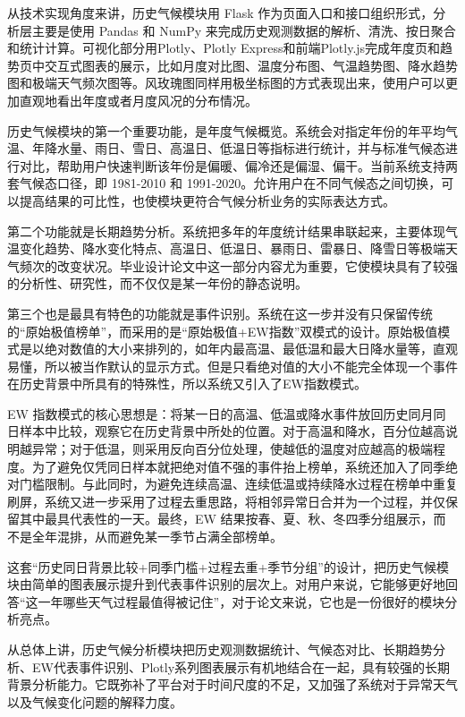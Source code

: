 从技术实现角度来讲，历史气候模块用 Flask 作为页面入口和接口组织形式，分析层主要是使用 Pandas 和 NumPy 来完成历史观测数据的解析、清洗、按日聚合和统计计算。可视化部分用Plotly、Plotly Express和前端Plotly.js完成年度页和趋势页中交互式图表的展示，比如月度对比图、温度分布图、气温趋势图、降水趋势图和极端天气频次图等。风玫瑰图同样用极坐标图的方式表现出来，使用户可以更加直观地看出年度或者月度风况的分布情况。

历史气候模块的第一个重要功能，是年度气候概览。系统会对指定年份的年平均气温、年降水量、雨日、雪日、高温日、低温日等指标进行统计，并与标准气候态进行对比，帮助用户快速判断该年份是偏暖、偏冷还是偏湿、偏干。当前系统支持两套气候态口径，即 1981-2010 和 1991-2020。允许用户在不同气候态之间切换，可以提高结果的可比性，也使模块更符合气候分析业务的实际表达方式。

第二个功能就是长期趋势分析。系统把多年的年度统计结果串联起来，主要体现气温变化趋势、降水变化特点、高温日、低温日、暴雨日、雷暴日、降雪日等极端天气频次的改变状况。毕业设计论文中这一部分内容尤为重要，它使模块具有了较强的分析性、研究性，而不仅仅是某一年份的静态说明。

第三个也是最具有特色的功能就是事件识别。系统在这一步并没有只保留传统的“原始极值榜单”，而采用的是“原始极值+EW指数”双模式的设计。原始极值模式是以绝对数值的大小来排列的，如年内最高温、最低温和最大日降水量等，直观易懂，所以被当作默认的显示方式。但是只看绝对值的大小不能完全体现一个事件在历史背景中所具有的特殊性，所以系统又引入了EW指数模式。

EW 指数模式的核心思想是：将某一日的高温、低温或降水事件放回历史同月同日样本中比较，观察它在历史背景中所处的位置。对于高温和降水，百分位越高说明越异常；对于低温，则采用反向百分位处理，使越低的温度对应越高的极端程度。为了避免仅凭同日样本就把绝对值不强的事件抬上榜单，系统还加入了同季绝对门槛限制。与此同时，为避免连续高温、连续低温或持续降水过程在榜单中重复刷屏，系统又进一步采用了过程去重思路，将相邻异常日合并为一个过程，并仅保留其中最具代表性的一天。最终，EW 结果按春、夏、秋、冬四季分组展示，而不是全年混排，从而避免某一季节占满全部榜单。

这套“历史同日背景比较+同季门槛+过程去重+季节分组”的设计，把历史气候模块由简单的图表展示提升到代表事件识别的层次上。对用户来说，它能够更好地回答“这一年哪些天气过程最值得被记住”，对于论文来说，它也是一份很好的模块分析亮点。

从总体上讲，历史气候分析模块把历史观测数据统计、气候态对比、长期趋势分析、EW代表事件识别、Plotly系列图表展示有机地结合在一起，具有较强的长期背景分析能力。它既弥补了平台对于时间尺度的不足，又加强了系统对于异常天气以及气候变化问题的解释力度。

